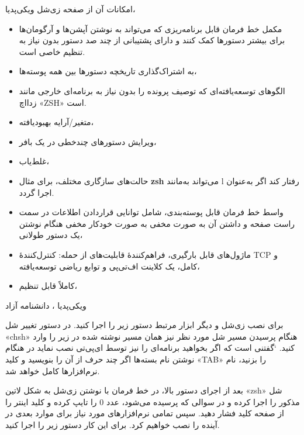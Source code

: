 امکانات آن از صفحه زی‌شل ویکی‌پدیا،
\begin{itemize}
    \item
مکمل خط فرمان قابل برنامه‌ریزی که می‌تواند به نوشتن آپشن‌ها و آرگومان‌ها برای بیشتر دستورها کمک کنند و دارای پشتیبانی از چند صد دستور بدون نیاز به تنظیم خاصی است.
\item
به اشتراک‌گذاری تاریخچه دستورها بین همه پوسته‌ها،
\item
الگوهای توسعه‌یافته‌ای که توصیف پرونده را بدون نیاز به برنامه‌ای خارجی مانند زدااچ «ZSH» است.
\item
متغیر/آرایه بهبودیافته،
\item
ویرایش دستورهای چندخطی در یک بافر،
\item
غلط‌یاب،
\item
حالت‌های سازگاری مختلف، برای مثال \textbf{zsh} می‌تواند به‌مانند 
l رفتار کند اگر به‌عنوان 
 اجرا گردد.
\item
واسط خط فرمان قابل پوسته‌بندی، شامل توانایی قراردادن اطلاعات در سمت راست صفحه و داشتن آن به صورت مخفی به صورت خودکار مخفی هنگام نوشتن یک دستور طولانی،
\item
ماژول‌های قابل بارگیری، فراهم‌کنندهٔ قابلیت‌های از حمله: کنترل‌کنندهٔ TCP و 
 کامل، یک کلاینت اف‌تی‌پی و توابع ریاضی توسعه‌یافته،
\item
کاملاً قابل تنظیم، 
\end{itemize} 
\begin{flushleft}
    ویکی‌پدیا ، دانشنامه آزاد
\end{flushleft}
برای نصب زی‌شل و دیگر ابزار مرتبط دستور زیر را اجرا کنید. در دستور تغییر شل «chsh» هنگام پرسیدن مسیر شل مورد نظر نیز همان مسیر نوشته شده در زیر را وارد کنید. ‘گفتنی است که اگر بخواهید برنامه‌ای را نیز توسط ای‌پی‌تی نصب نماید در هنگام نوشتن نام بسته‌ها اگر چند حرف از آن را بنویسید و کلید «TAB» را بزنید، نام نرم‌افزارها کامل خواهد شد.
\begin{latin}
    
\end{latin}
بعد از اجرای دستور بالا، در خط فرمان با نوشتن زی‌شل به شکل لاتین «zsh» شل مذکور را اجرا کرده و در سوالی که پرسیده می‌شود، عدد 0 را تایپ کرده و کلید اینتر را از صفحه کلید فشار دهید. سپس تمامی نرم‌افزارهای مورد نیاز برای موارد بعدی در آینده را نصب خواهیم کرد. برای این کار دستور زیر را اجرا کنید.
\begin{latin}
    
\end{latin}

